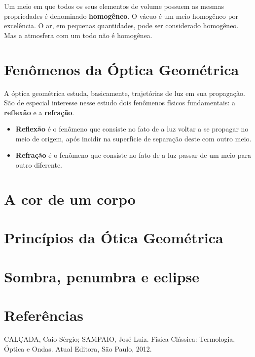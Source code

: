 \documentclass[11pt,twocolumn,oneside]{article}
\begin{document}
Um meio em que todos os seus elementos de volume possuem as mesmas propriedades é denominado \textbf{homogêneo}. O vácuo é um meio homogêneo por excelência. O ar, em pequenas quantidades, pode ser considerado homogêneo. Mas a atmosfera com um todo não é homogênea.


\hypertarget{x-fenômenos-da-óptica-geométrica}{\section{Fenômenos da Óptica Geométrica}}
A óptica geométrica estuda, basicamente, trajetórias de luz em sua propagação. São de especial interesse nesse estudo dois fenômenos físicos fundamentais: a \textbf{reflexão} e a \textbf{refração}.


\begin{itemize}

\item \textbf{Reflexão} é o fenômeno que consiste no fato de a luz voltar a se propagar no meio de origem, após incidir na superfície de separação deste com outro meio.

\item \textbf{Refração} é o fenômeno que consiste no fato de a luz passar de um meio para outro diferente.

\end{itemize}


\hypertarget{x-a-cor-de-um-corpo}{\section{A cor de um corpo}}

\hypertarget{x-princípios-da-ótica-geométrica}{\section{Princípios da Ótica Geométrica}}

\hypertarget{x-sombra,-penumbra-e-eclipse}{\section{Sombra, penumbra e eclipse}}

\hypertarget{x-referências}{\section{Referências}}
CALÇADA, Caio Sérgio; SAMPAIO, José Luiz. Física Clássica: Termologia, Óptica e Ondas. Atual Editora, São Paulo, 2012.
\end{document}
